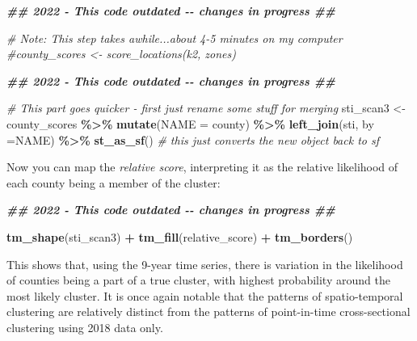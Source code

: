 \documentclass[
]{book}
\newenvironment{Shaded}{\begin{snugshade}}{\end{snugshade}}
\newcommand{\AttributeTok}[1]{\textcolor[rgb]{0.13,0.29,0.53}{#1}}
\newcommand{\CommentTok}[1]{\textcolor[rgb]{0.56,0.35,0.01}{\textit{#1}}}
\newcommand{\DocumentationTok}[1]{\textcolor[rgb]{0.56,0.35,0.01}{\textbf{\textit{#1}}}}
\newcommand{\FunctionTok}[1]{\textcolor[rgb]{0.13,0.29,0.53}{\textbf{#1}}}
\newcommand{\NormalTok}[1]{#1}
\newcommand{\OtherTok}[1]{\textcolor[rgb]{0.56,0.35,0.01}{#1}}
\newcommand{\SpecialCharTok}[1]{\textcolor[rgb]{0.81,0.36,0.00}{\textbf{#1}}}
\newcommand{\StringTok}[1]{\textcolor[rgb]{0.31,0.60,0.02}{#1}}
\begin{document}
\begin{Shaded}
\begin{Highlighting}[]
\DocumentationTok{\#\# 2022 {-} This code outdated {-}{-} changes in progress \#\#}

\CommentTok{\# Note: This step takes awhile...about 4{-}5 minutes on my computer}
\CommentTok{\#county\_scores \textless{}{-} score\_locations(k2, zones)}
\end{Highlighting}
\end{Shaded}

\begin{Shaded}
\begin{Highlighting}[]
\DocumentationTok{\#\# 2022 {-} This code outdated {-}{-} changes in progress \#\#}

\CommentTok{\# This part goes quicker {-} first just rename some stuff for merging}
\NormalTok{sti\_scan3 }\OtherTok{\textless{}{-}}\NormalTok{ county\_scores }\SpecialCharTok{\%\textgreater{}\%} 
  \FunctionTok{mutate}\NormalTok{(}\AttributeTok{NAME =}\NormalTok{ county) }\SpecialCharTok{\%\textgreater{}\%}
  \FunctionTok{left\_join}\NormalTok{(sti, }\AttributeTok{by =}\StringTok{\textquotesingle{}NAME\textquotesingle{}}\NormalTok{) }\SpecialCharTok{\%\textgreater{}\%}
  \FunctionTok{st\_as\_sf}\NormalTok{() }\CommentTok{\# this just converts the new object back to \textquotesingle{}sf\textquotesingle{}}
\end{Highlighting}
\end{Shaded}

Now you can map the \emph{relative score}, interpreting it as the relative likelihood of each county being a member of the cluster:

\begin{Shaded}
\begin{Highlighting}[]
\DocumentationTok{\#\# 2022 {-} This code outdated {-}{-} changes in progress \#\#}

\FunctionTok{tm\_shape}\NormalTok{(sti\_scan3) }\SpecialCharTok{+}
  \FunctionTok{tm\_fill}\NormalTok{(}\StringTok{\textquotesingle{}relative\_score\textquotesingle{}}\NormalTok{) }\SpecialCharTok{+} 
  \FunctionTok{tm\_borders}\NormalTok{()}
\end{Highlighting}
\end{Shaded}

This shows that, using the 9-year time series, there is variation in the likelihood of counties being a part of a true cluster, with highest probability around the most likely cluster. It is once again notable that the patterns of spatio-temporal clustering are relatively distinct from the patterns of point-in-time cross-sectional clustering using 2018 data only.
\end{document}
